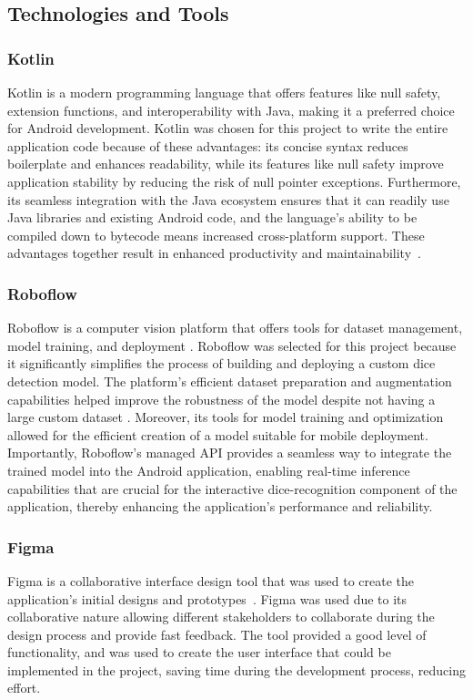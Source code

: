 \subsection{Technologies and Tools}

\subsubsection{Kotlin}
\label{sec:kotlin}
Kotlin is a modern programming language that offers features like null safety, extension functions, and interoperability with Java, making it a preferred choice for Android development. Kotlin was chosen for this project to write the entire application code because of these advantages: its concise syntax reduces boilerplate and enhances readability, while its features like null safety improve application stability by reducing the risk of null pointer exceptions. Furthermore, its seamless integration with the Java ecosystem ensures that it can readily use Java libraries and existing Android code, and the language's ability to be compiled down to bytecode means increased cross-platform support. These advantages together result in enhanced productivity and maintainability~\cite{bib:kotlin}.

\subsubsection{Roboflow}
\label{sec:roboflow}
Roboflow is a computer vision platform that offers tools for dataset management, model training, and deployment \cite{bib:roboflow}. Roboflow was selected for this project because it significantly simplifies the process of building and deploying a custom dice detection model. The platform's efficient dataset preparation and augmentation capabilities helped improve the robustness of the model despite not having a large custom dataset \cite{bib:kavidataset}. Moreover, its tools for model training and optimization allowed for the efficient creation of a model suitable for mobile deployment. Importantly, Roboflow's managed API provides a seamless way to integrate the trained model into the Android application, enabling real-time inference capabilities that are crucial for the interactive dice-recognition component of the application, thereby enhancing the application's performance and reliability.

\subsubsection{Figma}
\label{sec:figma}
Figma is a collaborative interface design tool that was used to create the application's initial designs and prototypes~\cite{bib:figma}. Figma was used due to its collaborative nature allowing different stakeholders to collaborate during the design process and provide fast feedback. The tool provided a good level of functionality, and was used to create the user interface that could be implemented in the project, saving time during the development process, reducing effort.


